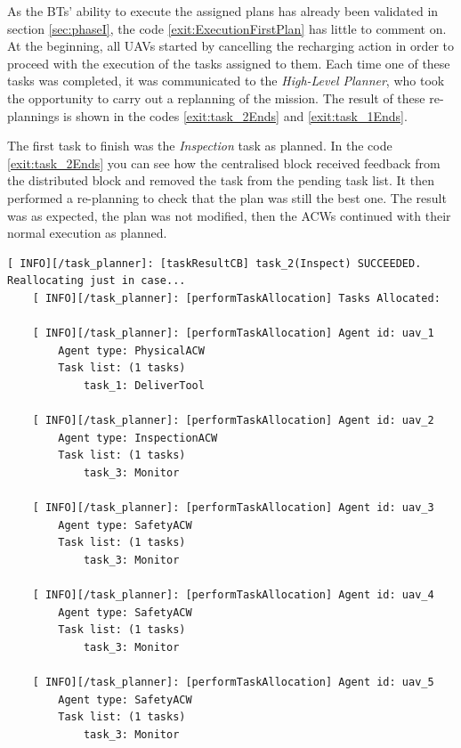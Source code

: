 As the \glspl{BT}' ability to execute the assigned plans has already been validated in section \ref{sec:phaseI}, the code \ref{exit:ExecutionFirstPlan} has little to comment on. At the beginning, all \glspl{UAV} started by cancelling the recharging action in order to proceed with the execution of the tasks assigned to them. Each time one of these tasks was completed, it was communicated to the \emph{High-Level Planner}, who took the opportunity to carry out a replanning of the mission. The result of these re-plannings is shown in the codes \ref{exit:task_2Ends} and \ref{exit:task_1Ends}.

The first task to finish was the \emph{Inspection} task as planned. In the code \ref{exit:task_2Ends} you can see how the centralised block received feedback from the distributed block and removed the task from the pending task list. It then performed a re-planning to check that the plan was still the best one. The result was as expected, the plan was not modified, then the \glspl{ACW} continued with their normal execution as planned. 

\begin{lstlisting}[caption={Feedback messages printed afert the \emph{Inspection} task ends}, breaklines=true, label=exit:task_2Ends]
    [ INFO][/task_planner]: [taskResultCB] task_2(Inspect) SUCCEEDED. Reallocating just in case...
    [ INFO][/task_planner]: [performTaskAllocation] Tasks Allocated:
    
    [ INFO][/task_planner]: [performTaskAllocation] Agent id: uav_1
        Agent type: PhysicalACW
        Task list: (1 tasks)
            task_1: DeliverTool
    
    [ INFO][/task_planner]: [performTaskAllocation] Agent id: uav_2
        Agent type: InspectionACW
        Task list: (1 tasks)
            task_3: Monitor
    
    [ INFO][/task_planner]: [performTaskAllocation] Agent id: uav_3
        Agent type: SafetyACW
        Task list: (1 tasks)
            task_3: Monitor
    
    [ INFO][/task_planner]: [performTaskAllocation] Agent id: uav_4
        Agent type: SafetyACW
        Task list: (1 tasks)
            task_3: Monitor
    
    [ INFO][/task_planner]: [performTaskAllocation] Agent id: uav_5
        Agent type: SafetyACW
        Task list: (1 tasks)
            task_3: Monitor
\end{lstlisting}

